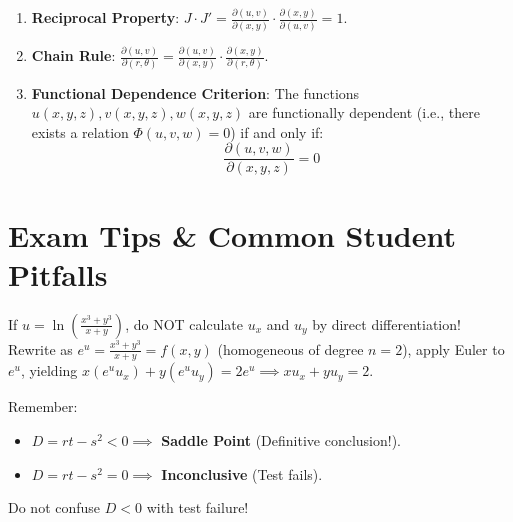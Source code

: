 \begin{theorem}
\begin{enumerate}[leftmargin=1.5em]
    \item \textbf{Reciprocal Property}: $J \cdot J' = \frac{\partial(u,v)}{\partial(x,y)} \cdot \frac{\partial(x,y)}{\partial(u,v)} = 1$.
    \item \textbf{Chain Rule}: $\frac{\partial(u,v)}{\partial(r,\theta)} = \frac{\partial(u,v)}{\partial(x,y)} \cdot \frac{\partial(x,y)}{\partial(r,\theta)}$.
    \item \textbf{Functional Dependence Criterion}: The functions $u(x,y,z), v(x,y,z), w(x,y,z)$ are functionally dependent (i.e., there exists a relation $\Phi(u,v,w) = 0$) if and only if:
    \begin{equation}
        \frac{\partial(u,v,w)}{\partial(x,y,z)} = 0
    \end{equation}
\end{enumerate}
\end{theorem}

\section{Exam Tips \& Common Student Pitfalls}

\begin{examtip}
If $u = \ln\left(\frac{x^3+y^3}{x+y}\right)$, do NOT calculate $u_x$ and $u_y$ by direct differentiation! Rewrite as $e^u = \frac{x^3+y^3}{x+y} = f(x,y)$ (homogeneous of degree $n = 2$), apply Euler to $e^u$, yielding $x(e^u u_x) + y(e^u u_y) = 2e^u \implies x u_x + y u_y = 2$.
\end{examtip}

\begin{commonmistake}
Remember:
\begin{itemize}
    \item $D = rt - s^2 < 0 \implies$ \textbf{Saddle Point} (Definitive conclusion!).
    \item $D = rt - s^2 = 0 \implies$ \textbf{Inconclusive} (Test fails).
\end{itemize}
Do not confuse $D < 0$ with test failure!
\end{commonmistake}

